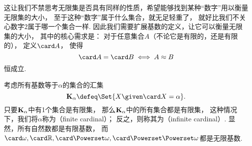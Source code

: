这让我们不禁思考无限集是否具有同样的性质，希望能够找到某种“数字”用以衡量无限集的大小，
至于这种“数字”属于什么集合，就无足轻重了，
就好比我们不关心数字\(2\)属于哪一个集合一样.
因此我们需要扩展基数的定义，让它可以衡量无限集的大小，
其中的核心需求是：
对于任意集合\(A\)（不论它是有限的，还是有限的），
定义\(\card A\)，
使得\begin{equation*}
	\card A = \card B
	\iff
	A \approx B
\end{equation*}恒成立.

考虑所有基数等于\(\alpha\)的集合的汇集\begin{equation*}
	\Ka \defeq \Set{ X \given \card X = \alpha }.
\end{equation*}
只要\(\mathbf{K}_\alpha\)中有1个集合是有限集，
那么\(\mathbf{K}_\alpha\)中的所有集合都是有限集，
这种情况下，我们将\(\alpha\)称为（finite cardinal）；
反之，则称其为（infinite cardinal）.
显然，所有自然数都是有限基数，
而\(\card\omega,
\card\mathbb{R},
\card\Powerset\omega,
\card\Powerset\Powerset\omega\)都是无限基数.
